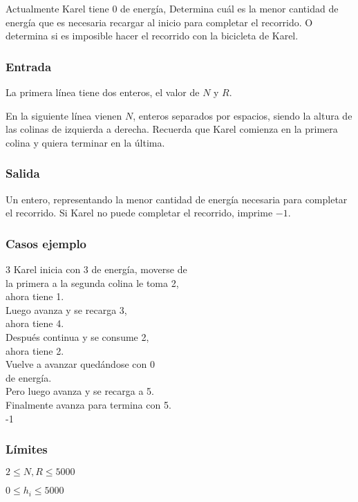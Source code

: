 Actualmente Karel tiene \(0\) de energía, Determina cuál es la menor cantidad de energía que es necesaria recargar al inicio para completar el recorrido. O determina si es imposible hacer el recorrido con la bicicleta de Karel.

\subsubsection*{Entrada}
La primera línea tiene dos enteros, el valor de \(N\) y \(R\).

En la siguiente línea vienen \(N\), enteros separados por espacios, siendo la altura de las colinas de izquierda a derecha. Recuerda que Karel comienza en la primera colina y quiera terminar en la última.
\subsubsection*{Salida}
Un entero, representando la menor cantidad de energía necesaria para completar el recorrido. Si Karel no puede completar el recorrido, imprime \(-1\).

\subsubsection*{Casos ejemplo}
\begin{casebox3}	
	{3}
	{
		Karel inicia con 3 de energía, moverse de   \\
		la primera a la segunda colina le toma 2,  \\
		ahora tiene 1.\\
		Luego avanza y se recarga 3,\\
		ahora tiene 4.\\
		Después continua y se consume 2,\\
		ahora tiene 2.\\		
		Vuelve a avanzar quedándose con 0\\
		de energía. \\		
		Pero luego avanza y se recarga a 5. \\
		Finalmente avanza para termina con 5. \\
	}
	{-1}
	{}
	\hline
\end{casebox3}	

\subsubsection*{Límites}
\begin{plimits}
	\item \(2\leq N, R \leq 5000\)
	\item \(0\leq h_i\leq 5000\)
\end{plimits}

